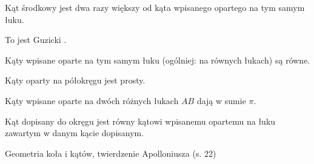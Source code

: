 
\begin{proposition}
    Kąt środkowy jest dwa razy większy od kąta wpisanego opartego na tym samym łuku.
\end{proposition}
To jest Guzicki \cite[s. 11]{guzicki_2021}.

\begin{corollary}
    Kąty wpisane oparte na tym samym łuku (ogólniej: na równych łukach) są równe.
\end{corollary}

\begin{corollary}
    Kąty oparty na półokręgu jest prosty.
\end{corollary}

\begin{corollary}
    \label{ab_twice_pi}
    Kąty wpisane oparte na dwóch różnych łukach $AB$ dają w sumie $\pi$.
\end{corollary}

\begin{proposition}
    Kąt dopisany do okręgu jest równy kątowi wpisanemu opartemu na łuku zawartym w danym kącie dopisanym.
\end{proposition}

Geometria koła i kątów, twierdzenie Apolloniusza (s. 22)